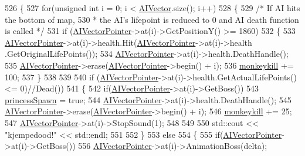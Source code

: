\begin{DoxyCode}
526 \{
527     \textcolor{keywordflow}{for}(\textcolor{keywordtype}{unsigned} \textcolor{keywordtype}{int} i = 0; i < \hyperlink{classTestApp_aaea1384b8c39b22595b4e583e4edc972}{AIVector}.size(); i++)
528     \{
529         \textcolor{comment}{/* If AI hits the bottom of map,}
530 \textcolor{comment}{        * the AI's lifepoint is reduced to 0 and AI death function is called */}
531         \textcolor{keywordflow}{if} (\hyperlink{classTestApp_ac409d674f567c5d2ea773bd7ec3036d9}{AIVectorPointer}->at(i)->GetPositionY() >= 1860)
532         \{
533             \hyperlink{classTestApp_ac409d674f567c5d2ea773bd7ec3036d9}{AIVectorPointer}->at(i)->health.Hit(\hyperlink{classTestApp_ac409d674f567c5d2ea773bd7ec3036d9}{AIVectorPointer}->at(i)->health
      .GetOriginalLifePoints());
534             \hyperlink{classTestApp_ac409d674f567c5d2ea773bd7ec3036d9}{AIVectorPointer}->at(i)->health.DeathHandle();
535             \hyperlink{classTestApp_ac409d674f567c5d2ea773bd7ec3036d9}{AIVectorPointer}->erase(\hyperlink{classTestApp_ac409d674f567c5d2ea773bd7ec3036d9}{AIVectorPointer}->begin() + i);
536             \hyperlink{classTestApp_aba2d3c363eb1101e637205c256540a3d}{monkeykill} += 100;
537         \}
538 
539 
540         \textcolor{keywordflow}{if} (\hyperlink{classTestApp_ac409d674f567c5d2ea773bd7ec3036d9}{AIVectorPointer}->at(i)->health.GetActualLifePoints() <= 0)\textcolor{comment}{//Dead())}
541         \{
542             \textcolor{keywordflow}{if}(\hyperlink{classTestApp_ac409d674f567c5d2ea773bd7ec3036d9}{AIVectorPointer}->at(i)->GetBoss())
543                 \hyperlink{classTestApp_a4ceef8b5824978f9be98ef51d58a6b8f}{princessSpawn} = \textcolor{keyword}{true};
544             \hyperlink{classTestApp_ac409d674f567c5d2ea773bd7ec3036d9}{AIVectorPointer}->at(i)->health.DeathHandle();
545             \hyperlink{classTestApp_ac409d674f567c5d2ea773bd7ec3036d9}{AIVectorPointer}->erase(\hyperlink{classTestApp_ac409d674f567c5d2ea773bd7ec3036d9}{AIVectorPointer}->begin() + i);
546             \hyperlink{classTestApp_aba2d3c363eb1101e637205c256540a3d}{monkeykill} += 25;
547             \hyperlink{classTestApp_ac409d674f567c5d2ea773bd7ec3036d9}{AIVectorPointer}->at(i)->StopSound(1);
548 
549 
550             std::cout << \textcolor{stringliteral}{"kjempedood!"} << std::endl;
551 
552         \}
553         \textcolor{keywordflow}{else}
554         \{
555             \textcolor{keywordflow}{if}(\hyperlink{classTestApp_ac409d674f567c5d2ea773bd7ec3036d9}{AIVectorPointer}->at(i)->GetBoss())
556                 \hyperlink{classTestApp_ac409d674f567c5d2ea773bd7ec3036d9}{AIVectorPointer}->at(i)->AnimationBoss(delta);

\end{DoxyCode}
